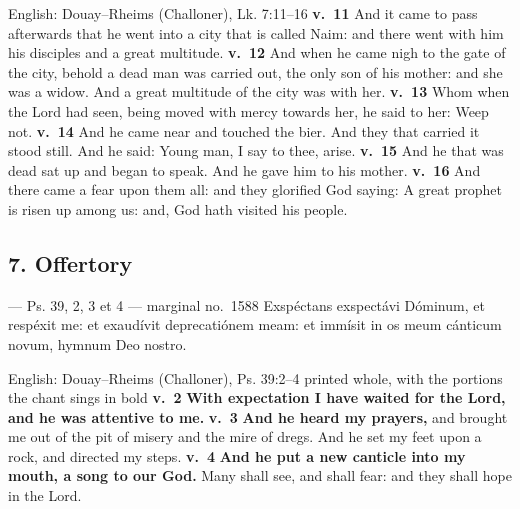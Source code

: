 \begin{namedtranslation}{English: Douay--Rheims (Challoner), Lk. 7:11--16}
\textbf{v.~11} And it came to pass afterwards that he went into a city that is
called Naim: and there went with him his disciples and a great multitude.
\textbf{v.~12} And when he came nigh to the gate of the city, behold a dead man
was carried out, the only son of his mother: and she was a widow. And a great
multitude of the city was with her. \textbf{v.~13} Whom when the Lord had seen,
being moved with mercy towards her, he said to her: Weep not. \textbf{v.~14} And
he came near and touched the bier. And they that carried it stood still. And he
said: Young man, I say to thee, arise. \textbf{v.~15} And he that was dead sat up
and began to speak. And he gave him to his mother. \textbf{v.~16} And there came
a fear upon them all: and they glorified God saying: A great prophet is risen up
among us: and, God hath visited his people.
\end{namedtranslation}


\elementguard
\subsection*{7. Offertory }

\begin{appointedlatin}{ --- Ps. 39, 2, 3 et 4 --- marginal no.\ 1588}
Exspéctans exspectávi Dóminum, et respéxit me: et exaudívit deprecatiónem meam:
et immísit in os meum cánticum novum, hymnum Deo nostro.
\end{appointedlatin}

\begin{namedtranslation}{English: Douay--Rheims (Challoner), Ps. 39:2--4 printed whole, with the portions the chant sings in bold}
\textbf{v.~2} \textbf{With expectation I have waited for the Lord, and he was
attentive to me.} \textbf{v.~3} \textbf{And he heard my prayers,} and brought me out of
the pit of misery and the mire of dregs. And he set my feet upon a rock, and
directed my steps. \textbf{v.~4} \textbf{And he put a new canticle into my
mouth, a song to our God.} Many shall see, and shall fear: and they shall hope
in the Lord.
\end{namedtranslation}

